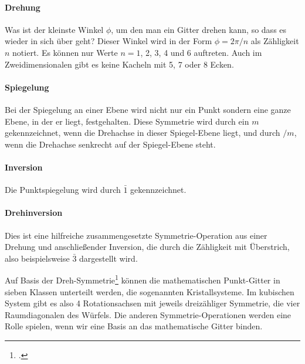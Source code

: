 \paragraph{Drehung} Was ist der kleinste Winkel $\phi$, um den man ein Gitter drehen kann, so dass es wieder in sich über geht? Dieser Winkel wird in der Form $\phi = 2 \pi / n$ als Zähligkeit $n$ notiert. Es können nur Werte $n= 1$, 2, 3, 4 und 6 auftreten. Auch im Zweidimensionalen gibt es keine Kacheln mit 5, 7 oder 8 Ecken.

\paragraph{Spiegelung} Bei der Spiegelung an einer Ebene wird nicht nur ein Punkt sondern eine ganze Ebene, in der er liegt, festgehalten. Diese Symmetrie wird durch ein $m$ gekennzeichnet, wenn die Drehachse in dieser Spiegel-Ebene liegt, und durch $/m$, wenn die Drehachse senkrecht auf der Spiegel-Ebene steht.

\paragraph{Inversion} Die Punktspiegelung wird durch $\bar{1}$ gekennzeichnet.

\paragraph{Drehinversion} Dies ist eine hilfreiche zusammengesetzte Symmetrie-Operation aus einer Drehung und anschließender Inversion, die durch die Zähligkeit mit Überstrich, also beispielsweise $\bar{3}$ dargestellt wird. 

Auf Basis der Dreh-Symmetrie\footcite{Hunklinger2014} können die mathematischen Punkt-Gitter in sieben Klassen unterteilt werden, die sogenannten Kristallsysteme. Im kubischen System gibt es also 4 Rotationsachsen mit jeweils dreizähliger Symmetrie, die vier Raumdiagonalen des Würfels. Die anderen Symmetrie-Operationen werden eine Rolle spielen, wenn wir eine Basis an das mathematische Gitter binden.



